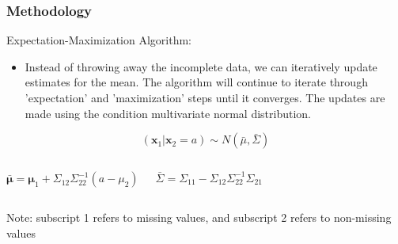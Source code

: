 \documentclass{beamer}
\begin{document}
\begin{frame}
\frametitle{Methodology}
Expectation-Maximization Algorithm:
\begin{itemize}
\item Instead of throwing away the incomplete data, we can iteratively update estimates for the  mean. The algorithm will continue to iterate through 'expectation' and 'maximization' steps until it converges. The updates are made using the condition multivariate normal distribution.
\end{itemize}
\medskip
\begin{equation*}
(\mathbf{x}_1 | \mathbf{x}_2=a) \sim N(\bar{\mu},\bar{\Sigma})
\end{equation*}

\begin{columns}[c] %

\begin{equation*}
\mathbf{\bar{\mu}} = \mathbf{\mu}_1 + \Sigma_{12}\Sigma_{22}^{-1}(a-\mu_{2})
\end{equation*}

\begin{equation*}
\bar{\Sigma} = \Sigma_{11} - \Sigma_{12}\Sigma_{22}^{-1}\Sigma_{21}
\end{equation*}

\end{columns}
\medskip
\medskip
\tiny{Note: subscript 1 refers to missing values, and subscript 2 refers to non-missing values}

\end{frame}


\end{document}
